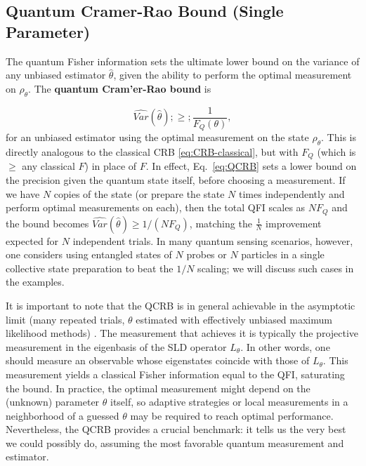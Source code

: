 \subsection{Quantum Cramer-Rao Bound (Single Parameter)}



The quantum Fisher information sets the ultimate lower bound on the
variance of any unbiased estimator $\hat{\theta}$, given the ability
to perform the optimal measurement on $\rho_\theta$. The
\textbf{quantum Cram'er-Rao bound} is

\begin{equation}
\widehat{Var}(\hat{\theta}) ;\ge; \frac{1}{F_Q(\theta)},
\label{eq:QCRB}
\end{equation}
for an unbiased estimator using the optimal measurement on the state
$\rho_\theta$. This is directly analogous to the classical CRB
\eqref{eq:CRB-classical}, but with $F_Q$ (which is $\ge$ any classical
$F$) in place of $F$. In effect, Eq.~\eqref{eq:QCRB} sets a lower
bound on the precision given the quantum state itself, before choosing
a measurement. If we have $N$ copies of the state (or prepare the
state $N$ times independently and perform optimal measurements on
each), then the total QFI scales as $N F_Q$ and the bound becomes
$\widehat{Var}(\hat{\theta}) \ge 1/(N F_Q)$, matching the $\frac{1}{N}$
improvement expected for $N$ independent trials. In many quantum
sensing scenarios, however, one considers using entangled states of
$N$ probes or $N$ particles in a single collective state preparation
to beat the $1/N$ scaling; we will discuss such cases in the examples.



It is important to note that the QCRB is in general achievable in the
asymptotic limit (many repeated trials, $\theta$ estimated with
effectively unbiased maximum likelihood methods)
\cite{BraunsteinCaves1994, Helstrom1976}. The measurement that
achieves it is typically the projective measurement in the eigenbasis
of the SLD operator $L_\theta$. In other words, one should measure an
observable whose eigenstates coincide with those of $L_\theta$. This
measurement yields a classical Fisher information equal to the QFI,
saturating the bound. In practice, the optimal measurement might
depend on the (unknown) parameter $\theta$ itself, so adaptive
strategies or local measurements in a neighborhood of a guessed
$\theta$ may be required to reach optimal performance. Nevertheless,
the QCRB provides a crucial benchmark: it tells us the very best we
could possibly do, assuming the most favorable quantum measurement and
estimator.



